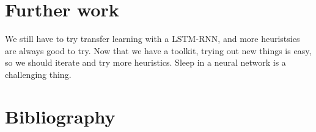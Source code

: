 \documentclass[a1,landscape]{a0poster}
\begin{document}
\begin{multicols}{4}
	  \section*{Further work}
	  We still have to try transfer learning with a LSTM-RNN, and more heuristsics are always good to try. Now that we have a toolkit, trying out new things is easy, so we should iterate and try more heuristics. Sleep in a neural network is a challenging thing.
    
    

        
\section*{Bibliography}
\tiny




\end{multicols}
\end{document}
